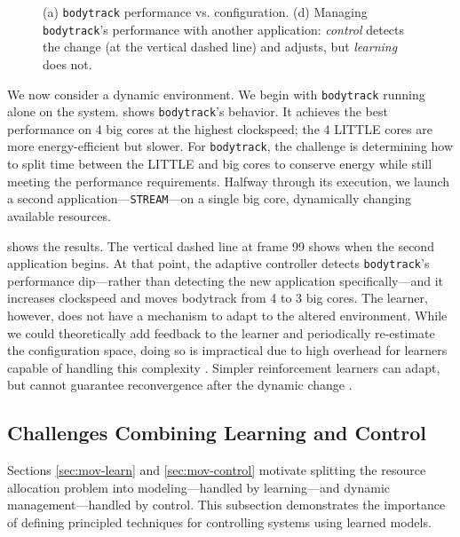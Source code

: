 \begin{figure}
\centering
  \subfloat[]
  {
    
    \label{fig:BODYTRACK_timeline}    
  }
  \caption{(a) \texttt{bodytrack} performance vs. configuration. (d)
    Managing \texttt{bodytrack}'s performance with another
    application: \emph{control} detects the change (at the vertical
    dashed line) and adjusts, but \emph{learning} does not.}
  \label{fig:control}
\end{figure}


We now consider a dynamic environment.  We begin with
\texttt{bodytrack} running alone on the system.
 shows \texttt{bodytrack}'s behavior.
It achieves the best performance on 4 big cores at the highest
clockspeed; the 4 LITTLE cores are more energy-efficient but slower.
For \texttt{bodytrack}, the challenge is determining how to split time
between the LITTLE and big cores to conserve energy while still
meeting the performance requirements. Halfway through its execution,
we launch a second application---\texttt{STREAM}---on a single big
core, dynamically changing available resources.

 shows the results.  The vertical
dashed line at frame 99 shows when the second application begins.  At
that point, the adaptive controller detects \texttt{bodytrack}'s
performance dip---rather than detecting the new application
specifically---and it increases clockspeed and moves bodytrack from 4
to 3 big cores.  The learner, however, does not have a mechanism to
adapt to the altered environment.  While we could theoretically add
feedback to the learner and periodically re-estimate the configuration
space, doing so is impractical due to high overhead for learners
capable of handling this complexity \cite{Paragon,quasar,LEO}.
Simpler reinforcement learners can adapt, but cannot guarantee
reconvergence after the dynamic change \cite{RL,TAAS}.


\subsection{Challenges Combining Learning and Control}
Sections \ref{sec:mov-learn} and \ref{sec:mov-control} motivate
splitting the resource allocation problem into modeling---handled by
learning---and dynamic management---handled by control. This
subsection demonstrates the importance of defining principled
techniques for controlling systems using learned models.

